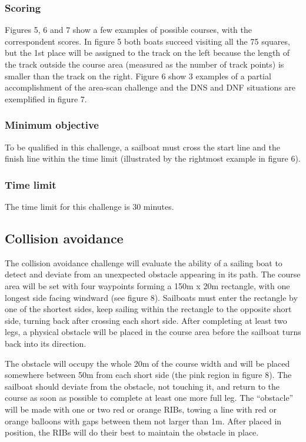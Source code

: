 \documentclass[12pt]{article}
\begin{document}
\subsubsection{Scoring}

Figures 5, 6 and 7 show a few examples of possible courses, with the
correspondent scores. In
figure 5 both boats succeed visiting all the 75 squares, but the 1st place will
be assigned to the
track on the left because the length of the track outside the course area
(measured as the
number of track points) is smaller than the track on the right. Figure 6 show 3
examples of a
partial accomplishment of the area-scan challenge and the DNS and DNF situations
are
exemplified in figure 7.

\subsubsection{Minimum objective}
To be qualified in this challenge, a sailboat must cross the start line and the
finish line within
the time limit (illustrated by the rightmost example in figure 6).
\subsubsection{Time limit}
The time limit for this challenge is 30 minutes.


\subsection{Collision avoidance}

The collision avoidance challenge will evaluate the ability of a sailing boat to
detect and deviate
from an unexpected obstacle appearing in its path. The course area will be set
with four
waypoints forming a 150m x 20m rectangle, with one longest side facing windward
(see figure
8). Sailboats must enter the rectangle by one of the shortest sides, keep
sailing within the
rectangle to the opposite short side, turning back after crossing each short
side. After
completing at least two legs, a physical obstacle will be placed in the course
area before the
sailboat turns back into its direction.

The obstacle will occupy the whole 20m of the course width and will be placed
somewhere
between 50m from each short side (the pink region in figure 8). The sailboat
should deviate
from the obstacle, not touching it, and return to the course as soon as possible
to complete at
least one more full leg. The “obstacle” will be made with one or two red or
orange RIBs, towing
a line with red or orange balloons with gaps between them not larger than 1m.
After placed in
position, the RIBs will do their best to maintain the obstacle in place.
\end{document}
